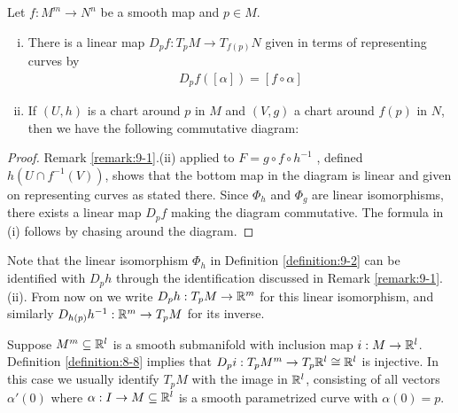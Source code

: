\begin{lemma}\label{lemma:9-3}
  Let $f:M^m\to N^n$ be a smooth map and $p\in M$.
  \begin{enumerate}[(i)]
    \item There is a linear map $D_pf:T_pM\to T_{f(p)}N$ given in terms of representing 
      curves by 
      \begin{align*}
        D_pf([\alpha]) = [f\circ \alpha]
      \end{align*}
    \item If $(U, h)$ is a chart around $p$ in $M$ and $(V, g)$ a chart around $f(p)$ in $N$,
      then we have the following commutative diagram:
      \begin{center}
      \end{center}
  \end{enumerate}
\end{lemma}

\begin{proof}
  Remark \ref{remark:9-1}.(ii) applied to $F=g\circ f\circ h^{-1}$ , defined
  $h(U\cap f^{-1}(V))$, shows that the bottom map in the diagram is linear and given
  on representing curves as stated there. Since $\Phi_h$ and $\Phi_g$ are linear isomorphisms,
  there exists a linear map $D_pf$ making the diagram commutative. The formula in
  (i) follows by chasing around the diagram.
\end{proof}

Note that the linear isomorphism $\Phi_h$ in Definition \ref{definition:9-2} can be identified with $D_ph$
through the identification discussed in Remark \ref{remark:9-1}.(ii). From now on we write 
$D_ph:T_pM\to{\ensuremath{\mathbb{R}}}^m$ for this linear isomorphism, and similarly $D_{h(p)}h^{-1}:{\mathbb{R}}^m\to T_pM$ for 
its inverse.

Suppose $M^m\subseteq {\ensuremath{\mathbb{R}}}^l$ is a smooth submanifold with inclusion map $i:M\to {\ensuremath{\mathbb{R}}}^l$. 
Definition \ref{definition:8-8} implies that $D_pi:T_pM^m\to T_p{\mathbb{R}}^l\cong {\ensuremath{\mathbb{R}}}^l$ is injective. In 
this case we usually identify $T_pM$ with the image in ${\mathbb{R}}^l$, consisting of all vectors 
$\alpha'(0)$ where $\alpha:I\to M\subseteq{\ensuremath{\mathbb{R}}}^l$ is a smooth parametrized curve with $\alpha(0)= p$.

